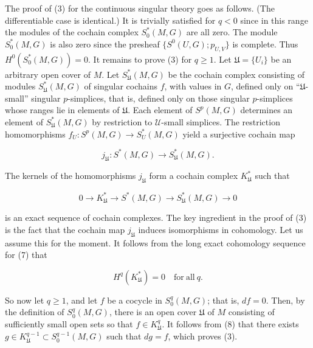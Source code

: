 The proof of (3) for the continuous singular theory goes as follows. (The differentiable case is identical.) It is trivially satisfied for $q<0$ since in this range the modules of the cochain complex $S_0^*(M,G)$ are all zero. The module $S_0^*(M,G)$ is also zero since the presheaf $\{S^0(U,G); p_{U,V}\}$ is complete. Thus $H^0(S_0^*(M,G))=0$. It remains to prove (3) for $q\geq1$. Let $\mathfrak{U}=\{U_i\}$ be an arbitrary open cover of $M$. Let $S_{\mathfrak{U}}^*(M,G)$ be the cochain complex consisting of modules $S_{\mathfrak{U}}^*(M,G)$ of singular cochains $f$, with values in $G$, defined only on “$\mathfrak{U}$-small” singular $p$-simplices, that is, defined only on those singular $p$-simplices whose ranges lie in elements of $\mathfrak{U}$. Each element of $S^p(M,G)$ determines an element of $S_{\mathfrak{U}}^*(M,G)$ by restriction to $\mathcal{U}$-small simplices. The restriction homomorphisms $f_U:S^p(M,G)\to S_U^*(M,G)$ yield a surjective cochain map

\begin{equation}
\tag{6}\label{eq:5.32:6}
j_{\mathfrak{U}}\colon S^{*}(M,G)\to S_{\mathfrak{U}}^{*}(M,G).
\end{equation}

The kernels of the homomorphisms $j_{\mathfrak{U}}$ form a cochain complex $K_{\mathfrak{U}}^{*}$ such that

\begin{equation}
\tag{7}\label{eq:5.32:7}
0\to K_{\mathfrak{U}}^{*}\to S^{*}(M,G)\to S_{\mathfrak{U}}^{*}(M,G)\to0
\end{equation}

is an exact sequence of cochain complexes. The key ingredient in the proof of (3) is the fact that the cochain map $j_{\mathfrak{U}}$ induces isomorphisms in cohomology. Let us assume this for the moment. It follows from the long exact cohomology sequence for (7) that

\begin{equation}
\tag{8}\label{eq:5.32:8}
H^{q}(K_{\mathfrak{U}}^{*})=0\quad\mathrm{for\ all}\ q.
\end{equation}

So now let $q \geq 1$, and let $f$ be a cocycle in $S_0^q(M,G)$; that is, $df = 0$. Then, by the definition of $S_0^q(M,G)$, there is an open cover $\mathfrak{U}$ of $M$ consisting of sufficiently small open sets so that $f \in K_{\mathfrak{U}}^q$. It follows from (8) that there exists $g \in K_{\mathfrak{U}}^{q-1} \subset S_0^{q-1}(M,G)$ such that $dg = f$, which proves (3).

